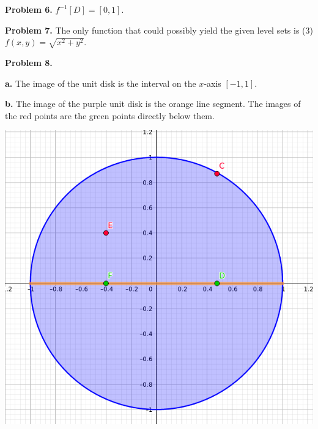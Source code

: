 \documentclass[oneside,12pt]{amsart}
\begin{document}
\medskip

\textbf{Problem 6.} $f^{-1}[D] = [0,1].$

\medskip

\textbf{Problem 7.}
The only function that could possibly yield the given level sets is
(3) $f(x,y) = \sqrt{x^2 + y^2}$.

\medskip

\textbf{Problem 8.}

\textbf{a.} The image of the unit disk is the interval on the $x$-axis
$[-1, 1]$.

\textbf{b.} The image of the purple unit disk is the orange line segment.
The images of the red points are the green points directly below them.

\includegraphics[scale=0.3]{project-circle}
\end{document}
